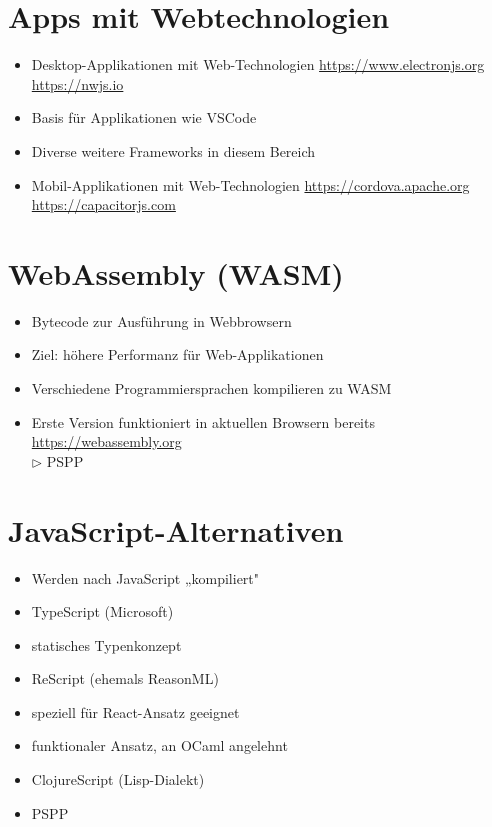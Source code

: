 \section*{Apps mit Webtechnologien}
\begin{itemize}
  \item Desktop-Applikationen mit Web-Technologien \href{https://www.electronjs.org}{https://www.electronjs.org} \href{https://nwjs.io}{https://nwjs.io}
  \item Basis für Applikationen wie VSCode
  \item Diverse weitere Frameworks in diesem Bereich
  \item Mobil-Applikationen mit Web-Technologien \href{https://cordova.apache.org}{https://cordova.apache.org} \href{https://capacitorjs.com}{https://capacitorjs.com}
\end{itemize}

\section*{WebAssembly (WASM)}
\begin{itemize}
  \item Bytecode zur Ausführung in Webbrowsern
  \item Ziel: höhere Performanz für Web-Applikationen
  \item Verschiedene Programmiersprachen kompilieren zu WASM
  \item Erste Version funktioniert in aktuellen Browsern bereits\\
\href{https://webassembly.org}{https://webassembly.org}\\
$\triangleright$ PSPP
\end{itemize}

\section*{JavaScript-Alternativen}
\begin{itemize}
  \item Werden nach JavaScript „kompiliert"
  \item TypeScript (Microsoft)
  \item statisches Typenkonzept
  \item ReScript (ehemals ReasonML)
  \item speziell für React-Ansatz geeignet
  \item funktionaler Ansatz, an OCaml angelehnt
  \item ClojureScript (Lisp-Dialekt)
  \item PSPP
\end{itemize}

